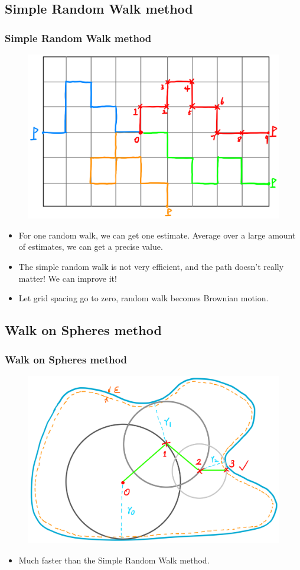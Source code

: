 \documentclass{beamer}
\begin{document}

\subsection{Simple Random Walk method}

\begin{frame}
\frametitle{Simple Random Walk method}
\begin{figure}[htbp]
    \centering
    \includegraphics[width=.6\textwidth]{./figs/srw}
\end{figure}
\begin{itemize}
    \item For one random walk, we can get one estimate. Average over a large amount of estimates, we can get a precise value.
    \item The simple random walk is not very efficient, and the path doesn't really matter! We can improve it!
    \item Let grid spacing go to zero, random walk becomes Brownian motion.
\end{itemize}
\end{frame}


\subsection{Walk on Spheres method}

\begin{frame}
\frametitle{Walk on Spheres method}
\begin{figure}[htbp]
    \centering
    \includegraphics[width=.8\textwidth]{./figs/wos}
\end{figure}
\begin{itemize}
    \item Much faster than the Simple Random Walk method.
\end{itemize}
\end{frame}
\end{document}
